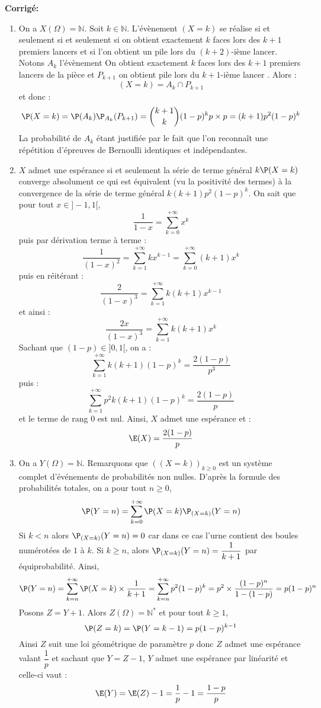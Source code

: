 \documentclass[a4paper,twoside,french,11pt]{VcCours}
\newcommand{\corr}{\textbf{Corrigé:}}
\begin{document}
\corr \begin{enumerate}
\item On a $X(\Omega) = \mathbb{N}$. Soit $k \in \mathbb{N}$. L'évènement $(X=k)$ se réalise si et seulement si et seulement si on obtient exactement $k$ faces lors des $k+1$ premiers lancers et si l'on obtient un pile lors du $(k+2)$-ième lancer. Notons $A_k$ l'évènement \og On obtient exactement $k$ faces lors des $k+1$ premiers lancers de la pièce \fg{} et $P_{k+1}$ \og on obtient pile lors du $k+1$-ième lancer \fg . Alors :
$$ (X=k) = A_k \cap P_{k+1}$$
et donc :
$$ \P(X=k) = \P(A_k) \P_{A_k}(P_{k+1}) = \binom{k+1}{k} (1-p)^k p \times p  = (k+1) p^2 (1-p)^k $$
La probabilité de $A_k$ étant justifiée par le fait que l'on reconnaît une répétition d'épreuves de Bernoulli identiques et indépendantes.
\item $X$ admet une espérance si et seulement la série de terme général $k \P(X=k)$ converge absolument ce qui est équivalent (vu la positivité des termes) à la convergence de la série de terme général $k(k+1)p^2 (1-p)^k$.
On sait que pour tout $x \in ]-1,1[$,
$$ \dfrac{1}{1-x} = \sum_{k=0}^{+ \infty} x^k$$
puis par dérivation terme à terme :
$$ \dfrac{1}{(1-x)^2} = \sum_{k=1}^{+ \infty} k x^{k-1} = \sum_{k=0}^{+ \infty} (k+1)x^k$$
puis en réitérant :
$$ \dfrac{2}{(1-x)^3} = \sum_{k=1}^{+ \infty} k(k+1)x^{k-1}$$
et ainsi :
$$ \dfrac{2x}{(1-x)^3} = \sum_{k=1}^{+ \infty} k(k+1)x^{k}$$
Sachant que $(1-p) \in ]0,1[$, on a :
$$ \sum_{k=1}^{+ \infty} k(k+1)(1-p)^{k} = \dfrac{2(1-p)}{p^3}$$
puis :
$$ \sum_{k=1}^{+ \infty}p^2 k(k+1)(1-p)^{k} = \dfrac{2(1-p)}{p}$$
et le terme de rang $0$ est nul. Ainsi, $X$ admet une espérance et :
$$ \E(X) =  \dfrac{2(1-p)}{p}$$
\item On a $Y(\Omega)= \mathbb{N}$. Remarquons que $((X=k))_{k \geq 0}$ est un système complet d'événements de probabilités non nulles. D'après la formule des probabilités totales, on a pour tout $n \geq 0$,
$$ \P(Y=n) = \sum_{k=0}^{+ \infty} \P(X=k) \P_{(X=k)}(Y=n)$$
Si $k<n$ alors $\P_{(X=k)}(Y=n)=0$ car dans ce cas l'urne contient des boules numérotées de $1$ à $k$. Si $k \geq n$, alors $\P_{(X=k)}(Y=n) = \dfrac{1}{k+1}$ par équiprobabilité. Ainsi,
$$ \P(Y=n) = \sum_{k=n}^{+ \infty} \P(X=k) \times \dfrac{1}{k+1} =  \sum_{k=n}^{+ \infty} p^2 (1-p)^k = p^2 \times \dfrac{(1-p)^n}{1-(1-p)} = p (1-p)^n$$
Posons $Z=Y+1$. Alors $Z(\Omega)= \mathbb{N}^*$ et pour tout $k \geq 1$,
$$ \P(Z=k)= \P(Y=k-1) = p (1-p)^{k-1}$$
Ainsi $Z$ suit une loi géométrique de paramètre $p$ donc $Z$ admet une espérance valant $\dfrac{1}{p}$ et sachant que $Y = Z-1$, $Y$ admet une espérance par linéarité et celle-ci vaut :
$$ \E(Y) = \E(Z) - 1 = \dfrac{1}{p}-1 = \dfrac{1-p}{p}$$
\end{enumerate}   
\end{document}
